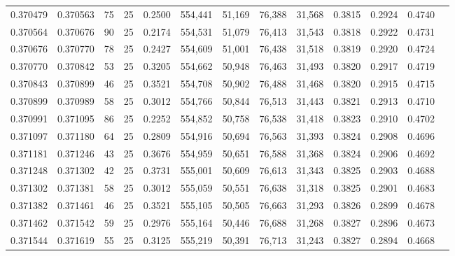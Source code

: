 \begin{tabular}{rrrrrrrrrrrrr}
0.370479 & 0.370563 &    75 &  25 &                                     0.2500 & 554,441 &  51,169 &  76,388 &  31,568 & 0.3815 & 0.2924 & 0.4740 \\
0.370564 & 0.370676 &    90 &  25 &                                     0.2174 & 554,531 &  51,079 &  76,413 &  31,543 & 0.3818 & 0.2922 & 0.4731 \\
0.370676 & 0.370770 &    78 &  25 &                                     0.2427 & 554,609 &  51,001 &  76,438 &  31,518 & 0.3819 & 0.2920 & 0.4724 \\
0.370770 & 0.370842 &    53 &  25 &                                     0.3205 & 554,662 &  50,948 &  76,463 &  31,493 & 0.3820 & 0.2917 & 0.4719 \\
0.370843 & 0.370899 &    46 &  25 &                                     0.3521 & 554,708 &  50,902 &  76,488 &  31,468 & 0.3820 & 0.2915 & 0.4715 \\
0.370899 & 0.370989 &    58 &  25 &                                     0.3012 & 554,766 &  50,844 &  76,513 &  31,443 & 0.3821 & 0.2913 & 0.4710 \\
0.370991 & 0.371095 &    86 &  25 &                                     0.2252 & 554,852 &  50,758 &  76,538 &  31,418 & 0.3823 & 0.2910 & 0.4702 \\
0.371097 & 0.371180 &    64 &  25 &                                     0.2809 & 554,916 &  50,694 &  76,563 &  31,393 & 0.3824 & 0.2908 & 0.4696 \\
0.371181 & 0.371246 &    43 &  25 &                                     0.3676 & 554,959 &  50,651 &  76,588 &  31,368 & 0.3824 & 0.2906 & 0.4692 \\
0.371248 & 0.371302 &    42 &  25 &                                     0.3731 & 555,001 &  50,609 &  76,613 &  31,343 & 0.3825 & 0.2903 & 0.4688 \\
0.371302 & 0.371381 &    58 &  25 &                                     0.3012 & 555,059 &  50,551 &  76,638 &  31,318 & 0.3825 & 0.2901 & 0.4683 \\
0.371382 & 0.371461 &    46 &  25 &                                     0.3521 & 555,105 &  50,505 &  76,663 &  31,293 & 0.3826 & 0.2899 & 0.4678 \\
0.371462 & 0.371542 &    59 &  25 &                                     0.2976 & 555,164 &  50,446 &  76,688 &  31,268 & 0.3827 & 0.2896 & 0.4673 \\
0.371544 & 0.371619 &    55 &  25 &                                     0.3125 & 555,219 &  50,391 &  76,713 &  31,243 & 0.3827 & 0.2894 & 0.4668 \\

\end{tabular}
